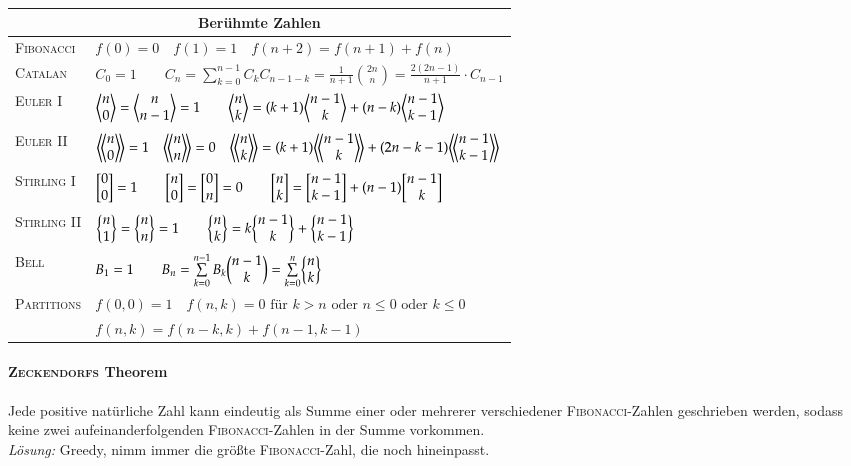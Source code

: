 \begin{flushleft}
	\begin{tabular}{ll}
		\toprule
		\multicolumn{2}{c}{Berühmte Zahlen} \\
		\midrule 
		\textsc{Fibonacci}	&
		$f(0) = 0 \quad
		f(1) = 1 \quad
		f(n+2) = f(n+1) + f(n)$ \\

		\textsc{Catalan}	&
		$C_0 = 1 \qquad
		C_n = \sum\limits_{k = 0}^{n - 1} C_kC_{n - 1 - k} =
		\frac{1}{n + 1}\binom{2n}{n} = \frac{2(2n - 1)}{n+1} \cdot C_{n-1}$ \\

		\textsc{Euler} I &
		$\biggl\langle \begin{matrix} n \\ 0 \end{matrix} \biggr\rangle = \biggl\langle \begin{matrix} n \\ n-1 \end{matrix} \biggr\rangle = 1 \qquad
		\biggl\langle \begin{matrix} n \\ k \end{matrix} \biggr\rangle = (k+1) \biggl\langle \begin{matrix} n-1 \\ k \end{matrix} \biggr\rangle + (n-k) \biggl\langle \begin{matrix} n-1 \\ k-1 \end{matrix} \biggr\rangle $ \\

		\textsc{Euler} II &
		$\eulerII{n}{0} = 1 \quad
		\eulerII{n}{n} = 0 \quad
		\eulerII{n}{k} = (k+1) \eulerII{n-1}{k} + (2n-k-1) \eulerII{n-1}{k-1}$ \\

		\textsc{Stirling} I &
		$\biggl[ \begin{matrix} 0 \\ 0 \end{matrix} \biggr] = 1 \qquad
		\biggl[ \begin{matrix} n \\ 0 \end{matrix} \biggr] = \biggl[ \begin{matrix} 0 \\ n \end{matrix} \biggr] = 0 \qquad
		\biggl[ \begin{matrix} n \\ k \end{matrix} \biggr] = \biggl[ \begin{matrix} n-1 \\ k-1 \end{matrix} \biggr] + (n-1) \biggl[ \begin{matrix} n-1 \\ k \end{matrix} \biggr]$ \\

		\textsc{Stirling} II &
		$\biggl\{ \begin{matrix} n \\ 1 \end{matrix} \biggr\} = \biggl\{ \begin{matrix} n \\ n \end{matrix} \biggr\} = 1 \qquad
		\biggl\{ \begin{matrix} n \\ k \end{matrix} \biggr\} = k \biggl\{ \begin{matrix} n-1 \\ k \end{matrix} \biggr\} + \biggl\{ \begin{matrix} n-1 \\ k-1 \end{matrix} \biggr\}$ \\

		\textsc{Bell} &
		$B_1 = 1 \qquad
		B_n = \sum\limits_{k = 0}^{n - 1} B_k\biggl( \begin{matrix} n-1 \\ k \end{matrix} \biggr)
		= \sum\limits_{k = 0}^{n}\biggl\{ \begin{matrix} n \\ k \end{matrix} \biggr\}$\\

		\textsc{Partitions} &
		$f(0,0) = 1 \quad
		f(n,k) = 0 \text{ für } k > n \text{ oder } n \leq 0 \text{ oder } k \leq 0$ \\
		& $f(n,k) = f(n-k,k) + f(n-1,k-1)$ \\
		\bottomrule
	\end{tabular}
\end{flushleft}

\paragraph{\textsc{Zeckendorfs} Theorem}
Jede positive natürliche Zahl kann eindeutig als Summe einer oder mehrerer
verschiedener \textsc{Fibonacci}-Zahlen geschrieben werden, sodass keine zwei
aufeinanderfolgenden \textsc{Fibonacci}-Zahlen in der Summe vorkommen.\\
\emph{Lösung:} Greedy, nimm immer die größte \textsc{Fibonacci}-Zahl, die noch
hineinpasst.

